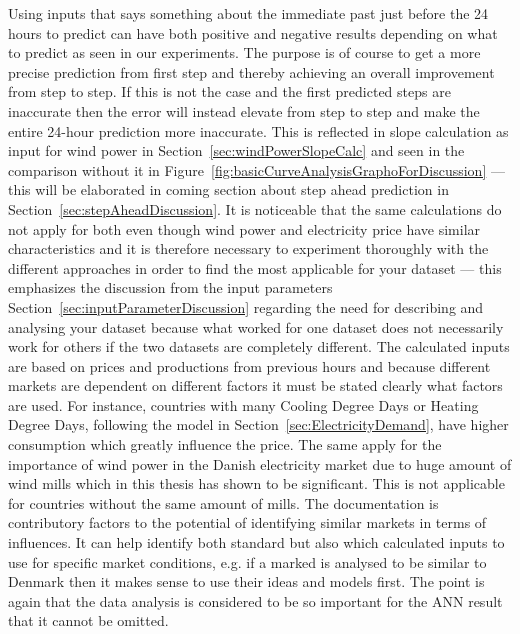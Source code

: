 Using inputs that says something about the immediate past just before the 24 hours to predict can have both positive and negative results depending on what to predict as seen in our experiments. The purpose is of course to get a more precise prediction from first step and thereby achieving an overall improvement from step to step. If this is not the case and the first predicted steps are inaccurate then the error will instead elevate from step to step and make the entire 24-hour prediction more inaccurate. This is reflected in slope calculation as input for wind power in Section~\ref{sec:windPowerSlopeCalc} and seen in the comparison without it in Figure~\ref{fig:basicCurveAnalysisGraphoForDiscussion} --- this will be elaborated in coming section about step ahead prediction in Section~\ref{sec:stepAheadDiscussion}. It is noticeable that the same calculations do not apply for both even though wind power and electricity price have similar characteristics and it is therefore necessary to experiment thoroughly with the different approaches in order to find the most applicable for your dataset --- this emphasizes the discussion from the input parameters Section~\ref{sec:inputParameterDiscussion} regarding the need for describing and analysing your dataset because what worked for one dataset does not necessarily work for others if the two datasets are completely different. The calculated inputs are based on prices and productions from previous hours and because different markets are dependent on different factors  it must be stated clearly what factors are used. For instance, countries with many Cooling Degree Days or Heating Degree Days, following the model in Section~\ref{sec:ElectricityDemand}, have higher consumption which greatly influence the price. The same apply for the importance of wind power in the Danish electricity market due to huge amount of wind mills which in this thesis has shown to be significant. This is not applicable for countries without the same amount of mills. The documentation is contributory factors to the potential of identifying similar markets in terms of influences. It can help identify both standard but also which calculated inputs to use for specific market conditions, e.g. if a marked is analysed to be similar to Denmark then it makes sense to use their ideas and models first. The point is again that the data analysis is considered to be so important for the ANN result that it cannot be omitted. 

